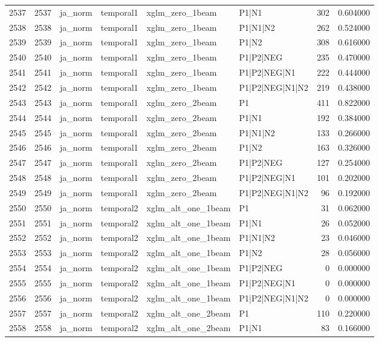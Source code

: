 \begin{tabular}{lrllllrr}
2537 & 2537 & ja_norm & temporal1 & xglm_zero_1beam & P1|N1 & 302 & 0.604000 \\
2538 & 2538 & ja_norm & temporal1 & xglm_zero_1beam & P1|N1|N2 & 262 & 0.524000 \\
2539 & 2539 & ja_norm & temporal1 & xglm_zero_1beam & P1|N2 & 308 & 0.616000 \\
2540 & 2540 & ja_norm & temporal1 & xglm_zero_1beam & P1|P2|NEG & 235 & 0.470000 \\
2541 & 2541 & ja_norm & temporal1 & xglm_zero_1beam & P1|P2|NEG|N1 & 222 & 0.444000 \\
2542 & 2542 & ja_norm & temporal1 & xglm_zero_1beam & P1|P2|NEG|N1|N2 & 219 & 0.438000 \\
2543 & 2543 & ja_norm & temporal1 & xglm_zero_2beam & P1 & 411 & 0.822000 \\
2544 & 2544 & ja_norm & temporal1 & xglm_zero_2beam & P1|N1 & 192 & 0.384000 \\
2545 & 2545 & ja_norm & temporal1 & xglm_zero_2beam & P1|N1|N2 & 133 & 0.266000 \\
2546 & 2546 & ja_norm & temporal1 & xglm_zero_2beam & P1|N2 & 163 & 0.326000 \\
2547 & 2547 & ja_norm & temporal1 & xglm_zero_2beam & P1|P2|NEG & 127 & 0.254000 \\
2548 & 2548 & ja_norm & temporal1 & xglm_zero_2beam & P1|P2|NEG|N1 & 101 & 0.202000 \\
2549 & 2549 & ja_norm & temporal1 & xglm_zero_2beam & P1|P2|NEG|N1|N2 & 96 & 0.192000 \\
2550 & 2550 & ja_norm & temporal2 & xglm_alt_one_1beam & P1 & 31 & 0.062000 \\
2551 & 2551 & ja_norm & temporal2 & xglm_alt_one_1beam & P1|N1 & 26 & 0.052000 \\
2552 & 2552 & ja_norm & temporal2 & xglm_alt_one_1beam & P1|N1|N2 & 23 & 0.046000 \\
2553 & 2553 & ja_norm & temporal2 & xglm_alt_one_1beam & P1|N2 & 28 & 0.056000 \\
2554 & 2554 & ja_norm & temporal2 & xglm_alt_one_1beam & P1|P2|NEG & 0 & 0.000000 \\
2555 & 2555 & ja_norm & temporal2 & xglm_alt_one_1beam & P1|P2|NEG|N1 & 0 & 0.000000 \\
2556 & 2556 & ja_norm & temporal2 & xglm_alt_one_1beam & P1|P2|NEG|N1|N2 & 0 & 0.000000 \\
2557 & 2557 & ja_norm & temporal2 & xglm_alt_one_2beam & P1 & 110 & 0.220000 \\
2558 & 2558 & ja_norm & temporal2 & xglm_alt_one_2beam & P1|N1 & 83 & 0.166000 \\

\end{tabular}
